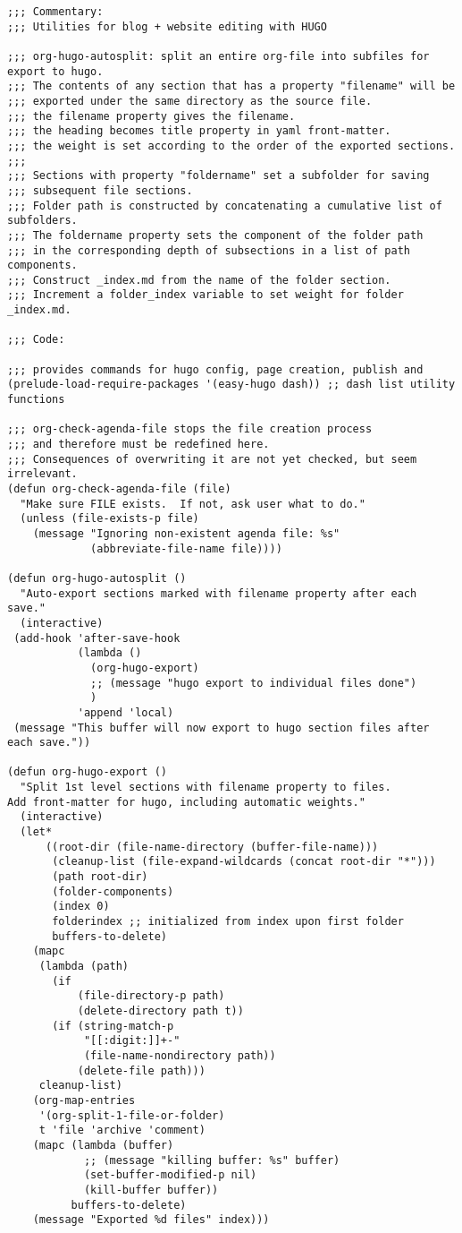 \documentclass[11pt]{article}
\begin{document}
\begin{verbatim}
;;; Commentary:
;;; Utilities for blog + website editing with HUGO

;;; org-hugo-autosplit: split an entire org-file into subfiles for export to hugo.
;;; The contents of any section that has a property "filename" will be
;;; exported under the same directory as the source file.
;;; the filename property gives the filename.
;;; the heading becomes title property in yaml front-matter.
;;; the weight is set according to the order of the exported sections.
;;;
;;; Sections with property "foldername" set a subfolder for saving
;;; subsequent file sections.
;;; Folder path is constructed by concatenating a cumulative list of subfolders.
;;; The foldername property sets the component of the folder path
;;; in the corresponding depth of subsections in a list of path components.
;;; Construct _index.md from the name of the folder section.
;;; Increment a folder_index variable to set weight for folder _index.md.

;;; Code:

;;; provides commands for hugo config, page creation, publish and
(prelude-load-require-packages '(easy-hugo dash)) ;; dash list utility functions

;;; org-check-agenda-file stops the file creation process
;;; and therefore must be redefined here.
;;; Consequences of overwriting it are not yet checked, but seem irrelevant.
(defun org-check-agenda-file (file)
  "Make sure FILE exists.  If not, ask user what to do."
  (unless (file-exists-p file)
    (message "Ignoring non-existent agenda file: %s"
             (abbreviate-file-name file))))

(defun org-hugo-autosplit ()
  "Auto-export sections marked with filename property after each save."
  (interactive)
 (add-hook 'after-save-hook
           (lambda ()
             (org-hugo-export)
             ;; (message "hugo export to individual files done")
             )
           'append 'local)
 (message "This buffer will now export to hugo section files after each save."))

(defun org-hugo-export ()
  "Split 1st level sections with filename property to files.
Add front-matter for hugo, including automatic weights."
  (interactive)
  (let*
      ((root-dir (file-name-directory (buffer-file-name)))
       (cleanup-list (file-expand-wildcards (concat root-dir "*")))
       (path root-dir)
       (folder-components)
       (index 0)
       folderindex ;; initialized from index upon first folder
       buffers-to-delete)
    (mapc
     (lambda (path)
       (if
           (file-directory-p path)
           (delete-directory path t))
       (if (string-match-p
            "[[:digit:]]+-"
            (file-name-nondirectory path))
           (delete-file path)))
     cleanup-list)
    (org-map-entries
     '(org-split-1-file-or-folder)
     t 'file 'archive 'comment)
    (mapc (lambda (buffer)
            ;; (message "killing buffer: %s" buffer)
            (set-buffer-modified-p nil)
            (kill-buffer buffer))
          buffers-to-delete)
    (message "Exported %d files" index)))


\end{verbatim}
\end{document}
